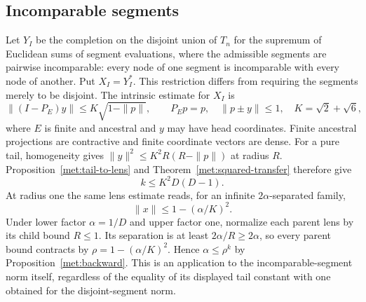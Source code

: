 \subsection{Incomparable segments}\label{met:incomparable-section}
Let $Y_I$ be the completion on the disjoint union of $T_n$ for the
supremum of Euclidean sums of segment evaluations, where the admissible
segments are pairwise incomparable: every node of one segment is
incomparable with every node of another. Put $X_I=Y_I^*$. This
restriction differs from requiring the segments merely to be disjoint.
The intrinsic estimate for $X_I$ \cite[Theorem~9.5]{TreePotentials}
is
\[
 \|(I-P_E)y\|\le K\sqrt{1-\|p\|},\qquad
 P_Ep=p,\quad \|p\pm y\|\le1,\quad K=\sqrt2+\sqrt6,
\]
where $E$ is finite and ancestral and $y$ may have head coordinates.
Finite ancestral projections are contractive and finite coordinate
vectors are dense. For a pure tail, homogeneity gives
$\|y\|^2\le K^2R(R-\|p\|)$ at radius $R$.
Proposition~\ref{met:tail-to-lens} and
Theorem~\ref{met:squared-transfer} therefore give
\begin{equation}\label{met:incomparable-additive}
 k\le K^2D(D-1).
\end{equation}
At radius one the same lens estimate reads, for an infinite
$2\alpha$-separated family,
\[
 \|x\|\le1-(\alpha/K)^2.
\]
Under lower factor $\alpha=1/D$ and upper factor one, normalize each
parent lens by its child bound $R\le1$. Its separation is at least
$2\alpha/R\ge2\alpha$, so every parent bound contracts by
$\rho=1-(\alpha/K)^2$. Hence $\alpha\le\rho^k$ by
Proposition~\ref{met:backward}. This is an application to the
incomparable-segment norm itself, regardless of the equality of its
displayed tail constant with one obtained for the disjoint-segment norm.
